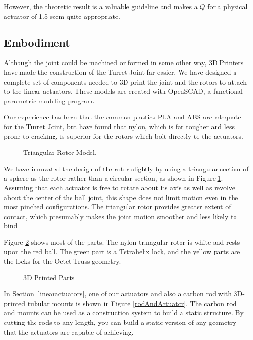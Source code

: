 \documentclass[11pt]{article}
\begin{document}
 However, the theoretic result is a valuable guideline and makes a $Q$ for a physical actuator of 1.5 seem quite appropriate.

 \subsection{Embodiment}

 Although the joint could be machined or formed in some other way,
 3D Printers have made the construction of the Turret Joint far easier.
 We have designed a complete set of components needed to 3D print the joint and the rotors to attach to
 the linear actuators. These models are created with OpenSCAD, a functional parametric modeling program.

 Our experience has been that the common plastics PLA and ABS are adequate for the Turret Joint,
 but have found that nylon, which is far tougher and less prone to cracking, is superior for the
 rotors which bolt directly to the actuators.

 \begin{figure}[!ht]
  \centering
    \caption[Triangular Rotor Model]{Triangular Rotor Model.}
      \label{rotormodel}
\end{figure}

 We have innovated the design of the rotor slightly by using a triangular section of a sphere as the
 rotor rather than a circular section, as shown in Figure \ref{rotormodel}.
 Assuming that each actuator is free to rotate about its axis as well as revolve about the
 center of the ball joint, this shape does not limit motion even in the most pinched
 configurations. The triangular rotor provides greater extent of contact,
 which presumably makes the joint motion
 smoother and less likely to bind.
 

 Figure \ref{parts} shows most of the parts. The nylon trinagular rotor is white and rests upon
 the red ball. The green part is a Tetrahelix lock, and the yellow parts are the locks for the Octet Truss
 geometry.

\begin{figure}[!ht]
  \centering
    \caption[3D Printed Parts]{3D Printed Parts}
      \label{parts}
\end{figure}

In Section \ref{linearactuators}, one of our actuators and also a carbon rod with 3D-printed tubular mounts
is shown in Figure \ref{rodAndActuator}.
The carbon rod and mounts can be used as a construction system to build a static structure.
By cutting the rods to any length, you can build a static version of any geometry that the actuators
are capable of achieving.
\end{document}
